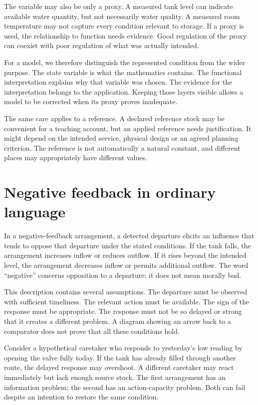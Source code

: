 The variable may also be only a proxy. A measured tank level can indicate available water quantity, but not necessarily water quality. A measured room temperature may not capture every condition relevant to storage. If a proxy is used, the relationship to function needs evidence. Good regulation of the proxy can coexist with poor regulation of what was actually intended.

For a model, we therefore distinguish the represented condition from the wider purpose. The state variable is what the mathematics contains. The functional interpretation explains why that variable was chosen. The evidence for the interpretation belongs to the application. Keeping those layers visible allows a model to be corrected when its proxy proves inadequate.

The same care applies to a reference. A declared reference stock may be convenient for a teaching account, but an applied reference needs justification. It might depend on the intended service, physical design or an agreed planning criterion. The reference is not automatically a natural constant, and different places may appropriately have different values.

\section{Negative feedback in ordinary language}
In a negative-feedback arrangement, a detected departure elicits an influence that tends to oppose that departure under the stated conditions. If the tank falls, the arrangement increases inflow or reduces outflow. If it rises beyond the intended level, the arrangement decreases inflow or permits additional outflow. The word ``negative'' concerns opposition to a departure; it does not mean morally bad.

This description contains several assumptions. The departure must be observed with sufficient timeliness. The relevant action must be available. The sign of the response must be appropriate. The response must not be so delayed or strong that it creates a different problem. A diagram showing an arrow back to a comparator does not prove that all these conditions hold.

Consider a hypothetical caretaker who responds to yesterday's low reading by opening the valve fully today. If the tank has already filled through another route, the delayed response may overshoot. A different caretaker may react immediately but lack enough source stock. The first arrangement has an information problem; the second has an action-capacity problem. Both can fail despite an intention to restore the same condition.

